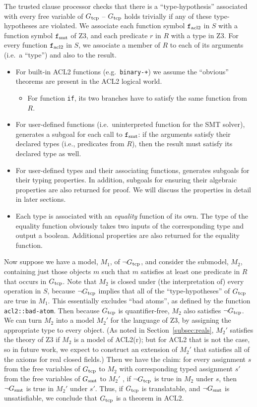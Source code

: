 The trusted clause processor checks that there is a ``type-hypothesis'' associated
with every free variable of $G_{\mathrm{tcp}}$ -- $G_{\mathrm{tcp}}$ holds trivially if any of these
type-hypotheses are violated.
We associate each function symbol $\mathtt{f}_{\mathrm{acl2}}$ in $S$ with a function symbol $\mathtt{f}_{\mathrm{smt}}$
of Z3, and each predicate $r$ in $R$ with a type in Z3.
For every function $\mathtt{f}_{\mathrm{acl2}}$ in $S$, we associate a member of $R$ to each of its
arguments (i.e.\ a ``type'') and also to the result.
\begin{itemize}
\item For built-in ACL2 functions (e.g.\ \texttt{binary-+}) we assume the
  ``obvious'' theorems are present in the ACL2 logical world. 
  \begin{itemize}
  \item For function \texttt{if}, its two branches have to satisfy the same
    function from $R$.
  \end{itemize}
\item For user-defined functions (i.e.\ uninterpreted function for the SMT
  solver), \smtlink{} generates a subgoal for each call to $\mathtt{f}_{\mathrm{smt}}$: if the
  arguments satisfy their declared types (i.e., predicates from $R$), then the
  result must satisfy its declared type as well.
\item For user-defined types and their associating functions, \smtlink{}
  generates subgoals for their typing properties. In addition, subgoals for
  ensuring their algebraic properties are also returned for proof. We will
  discuss the properties in detail in later sections.
\item Each type is associated with an \emph{equality} function of its own. The
  type of the equality function obviously takes two inputs of the corresponding
  type and output a boolean.
  Additional properties are also returned for the equality function.
\end{itemize}

Now suppose we have a model, $M_1$, of $\neg G_{\mathrm{tcp}}$, and consider the submodel,
$M_2$, containing just those objects $m$ such that $m$ satisfies at least one
predicate in $R$ that occurs in $G_{\mathrm{tcp}}$.
Note that $M_2$ is closed under (the interpretation of) every operation in $S$,
because $\neg G_{\mathrm{tcp}}$ implies that all of the ``type-hypotheses'' of $G_{\mathrm{tcp}}$ are
true in $M_1$.
This essentially excludes ``bad atoms'', as defined by the function
\texttt{acl2::bad-atom}.
Then because $G_{\mathrm{tcp}}$ is quantifier-free, $M_2$ also satisfies $\neg G_{\mathrm{tcp}}$.
We can turn $M_2$ into a model $M_2'$ for the language of Z3, by
assigning the appropriate type to every object.
(As noted in Section~\ref{subsec:reals}, $M_2'$ satisfies the theory of
Z3 if $M_2$ is a model of ACL2(r); but for ACL2 that is not the
case, so in future work, we expect to construct an extension of $M_2'$ that
satisfies all of the axioms for real closed fields.)
Then we have the claim: for every assignment $s$ from the free variables of
$G_{\mathrm{tcp}}$ to $M_2$ with corresponding typed assignment $s'$ from the free
variables of $G_{\mathrm{smt}}$ to $M_2'$ , if $\neg G_{\mathrm{tcp}}$ is true in $M_2$ under $s$,
then $\neg G_{\mathrm{smt}}$ is true in $M_2'$ under $s'$.
Thus, if $G_{\mathrm{tcp}}$ is translatable, and $\neg G_{\mathrm{smt}}$ is unsatisfiable, we conclude
that $G_{\mathrm{tcp}}$ is a theorem in ACL2.

